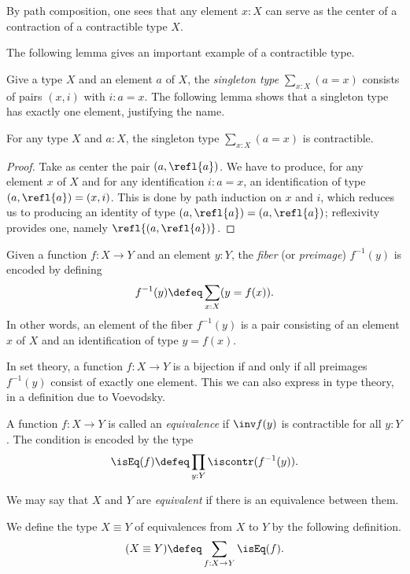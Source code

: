 By path composition, one sees that any element $x : X$ can serve as the center of a contraction of a contractible type $X$.

The following lemma gives an important example of a contractible type.

Give a type $X$ and an element $a$ of $X$,
the \emph{singleton type} $\sum_{x:X} (a=x)$
consists of pairs $(x,i)$ with $i: a=x$. The following lemma shows that a singleton type has exactly one element, justifying the name.

\begin{lemma}\label{lem:thepathspaceiscontractible}
For any type $X$ and $a:X$, the singleton type $\sum_{x:X} (a=x)$ is contractible.
\end{lemma}

\begin{proof}
Take as center the pair $(a,\refl{a})$. We have
to produce, for any element $x$ of $X$ and for any identification
$i: a=x$, an identification of type $(a,\refl{a}) = (x,i)$.  This is done by path induction on $x$ and $i$, which reduces us to producing
an identity of type $(a,\refl{a}) = (a,\refl{a})$; reflexivity provides one, namely $\refl{(a,\refl{a})}$.
\end{proof}

\begin{definition}
\label{def:fiber}
Given a function $f : X \to Y$ and an element $y:Y$,
the \emph{fiber} (or \emph{preimage}) $f^{-1}(y)$
is encoded by defining $$f^{-1}(y) \defeq \sum_{x:X}(y = f(x)).$$
In other words, an element of the fiber $f^{-1}(y)$ is a pair consisting
of an element $x$ of $X$ and an identification of type $y = f(x)$.
\end{definition}

In set theory, a function $f : X \to Y$ is a bijection if and only if
all preimages $f^{-1}(y)$ consist of exactly one element.
This we can also express in type theory, in a definition due
to Voevodsky.

\begin{definition}
  \label{def:equivalence}
  A function $f : X \to Y$ is called an \emph{equivalence} if $\inv f(y)$ is contractible for
  all $y:Y$.  The condition is encoded by the type $$\isEq(f) \defeq \prod_{y:Y}\iscontr(f^{-1}(y)).$$
\end{definition}

We may say that $X$ and $Y$ are \emph{equivalent} if there is an equivalence between them.

\begin{definition}
  \label{def:type-of-equivalences}
  We define the type $X \equiv Y$ of equivalences from $X$ to $Y$ by the following definition.
  \[
  (X\equiv Y) \defeq \sum_{f:X\to Y} \isEq(f).
  \]
\end{definition}


